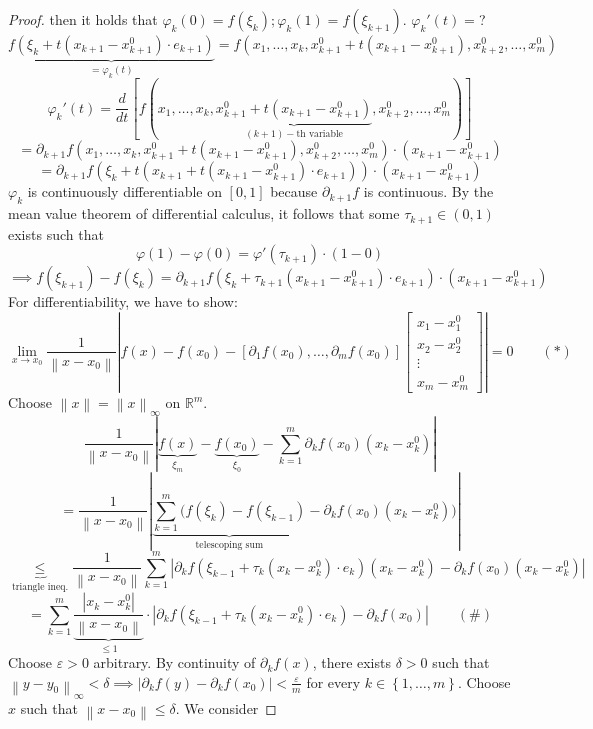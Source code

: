 \documentclass{article}
\newcommand{\set}[1]{\left\{#1\right\}}
\newcommand{\norm}[1]{\left\|#1\right\|}
\newcommand{\card}[1]{\left|#1\right|}
\begin{document}
\begin{proof}
  then it holds that $\varphi_k(0) = f(\xi_k); \varphi_k(1) = f(\xi_{k+1})$. $\varphi_k'(t) = $?
  \[ \underbrace{f(\xi_k + t(x_{k+1} - x_{k+1}^0) \cdot e_{k+1})}_{= \varphi_k(t)} = f(x_1, \dots, x_k, x_{k+1}^0 + t(x_{k+1} - x_{k+1}^0), x_{k+2}^0, \dots, x_m^0) \]
  \[ \varphi_k'(t) = \frac{d}{dt} \left[f(x_1, \dots, x_k, \underbrace{x_{k+1}^0 + t(x_{k+1} - x_{k+1}^0)}_{(k+1)-\text{th variable}}, x_{k+2}^0, \dots, x_m^0)\right] \]
  \[ = \partial_{k+1} f(x_1, \dots, x_k, x_{k+1}^0 + t(x_{k+1} - x_{k+1}^0), x_{k+2}^0, \dots, x_m^0) \cdot (x_{k+1} - x_{k+1}^0) \]
  \[ = \partial_{k+1} f(\xi_k + t(x_{k+1} + t(x_{k+1} - x_{k+1}^0) \cdot e_{k+1})) \cdot (x_{k+1} - x_{k+1}^0) \]
  $\varphi_k$ is continuously differentiable on $[0,1]$ because $\partial_{k+1} f$ is continuous.
  By the mean value theorem of differential calculus, it follows that some $\tau_{k+1} \in (0,1)$ exists such that
  \[ \varphi(1) - \varphi(0) = \varphi'(\tau_{k+1}) \cdot (1 - 0) \]
  \[ \implies f(\xi_{k+1}) - f(\xi_k) = \partial_{k+1} f(\xi_k + \tau_{k+1}(x_{k+1} - x_{k+1}^0) \cdot e_{k+1}) \cdot (x_{k+1} - x_{k+1}^0) \]
  For differentiability, we have to show:
  \[ \lim_{x\to x_0} \frac{1}{\norm{x - x_0}} \card{f(x) - f(x_0) - [\partial_1 f(x_0), \dots, \partial_m f(x_0)] \begin{bmatrix} x_1 - x_1^0 \\ x_2 - x_2^0 \\ \vdots \\ x_m - x_m^0 \end{bmatrix}} = 0 \qquad (*) \]
  Choose $\norm{x} = \norm{x}_{\infty}$ on $\mathbb R^m$.
  \[ \frac{1}{\norm{x - x_0}} \card{\underbrace{f(x)}_{\xi_m} - \underbrace{f(x_0)}_{\xi_0} - \sum_{k=1}^m \partial_k f(x_0) (x_k - x_k^0)} \]
  \[ = \frac{1}{\norm{x - x_0}} \card{\underbrace{\sum_{k=1}^m (f(\xi_k) - f(\xi_{k-1})}_{\text{telescoping sum}} - \partial_k f(x_0) (x_k - x_k^0))} \]
  \[ \underbrace{\leq}_{\text{triangle ineq.}} \frac{1}{\norm{x - x_0}} \sum_{k=1}^m \card{\partial_k f(\xi_{k-1} + \tau_k (x_k - x_k^0) \cdot e_k) (x_k - x_k^0) - \partial_k f(x_0) (x_k - x_k^0)} \]
  \[ = \sum_{k=1}^m \underbrace{\frac{\card{x_k - x_k^0}}{\norm{x - x_0}}}_{\leq 1} \cdot \card{\partial_k f(\xi_{k-1} + \tau_k(x_k - x_k^0) \cdot e_k) - \partial_k f(x_0)} \qquad (\#) \]
  Choose $\varepsilon > 0$ arbitrary. By continuity of $\partial_k f(x)$, there exists $\delta > 0$ such that $\norm{y - y_0}_{\infty} < \delta \implies \card{\partial_k f(y) - \partial_k f(x_0)} < \frac\varepsilon{m}$ for every $k \in \set{1, \dots, m}$.
  Choose $x$ such that $\norm{x - x_0} \leq \delta$. We consider

\end{proof}
\end{document}
